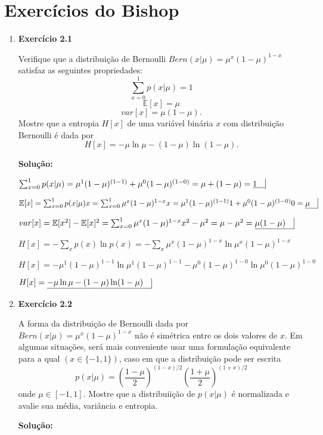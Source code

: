 \section*{Exercícios do Bishop}

\begin{enumerate}


\item \textbf{Exercício 2.1} \par
Verifique que a distribuição de Bernoulli $Bern(x|\mu) = \mu^x(1-\mu)^{1-x}$ satisfaz as  seguintes propriedades:
\begin{equation*}
    \sum_{x=0}^1 p(x|\mu) = 1
\end{equation*}
\begin{equation*}
    \mathbb{E}[x] = \mu
\end{equation*}
\begin{equation*}
    var[x]=\mu(1-\mu).
\end{equation*}
Mostre que a entropia $H[x]$ de uma variável binária $x$ com distribuição Bernoulli é dada por
\begin{equation*}
    H[x] = -\mu\ln\mu - (1-\mu)\ln(1-\mu).
\end{equation*}
\par
\textbf{Solução:}
\par
$\sum_{x=0}^{1} p(x|\mu) =  \mu^1(1-\mu)^{(1-1)} + \mu^0(1-\mu)^{(1-0)} = \mu + (1-\mu) = \underline{1 \quad} \vline $


$\mathbb{E}[x] = \sum_{x=0}^{1} p(x|\mu) x =  \sum_{x=0}^{1} \mu^x(1-\mu)^{1-x} x  = \mu^1(1-\mu)^{(1-1)} 1 + \mu^0(1-\mu)^{(1-0)} 0 = \underline{ \mu \quad} \vline $

$ var[x] = \mathbb{E}[x^2] - \mathbb{E}[x]^2 =  \sum_{x=0}^{1} \mu^x(1-\mu)^{1-x} x^2 - \mu^2 = \mu - \mu^2 = \underline{ \mu(1-\mu) \quad} \vline $

$H[x] = -\sum_x p(x) \ln p(x) = -\sum_x \mu^x(1-\mu)^{1-x} \ln  \mu^x(1-\mu)^{1-x}$

$H[x] =  - \mu^1(1-\mu)^{1-1} \ln  \mu^1(1-\mu)^{1-1} -  \mu^0(1-\mu)^{1-0} \ln  \mu^0(1-\mu)^{1-0}$

$H[x] = \underline{ - \mu \ln  \mu -   (1-\mu) \ln  (1-\mu) \quad} \vline$




\item \textbf{Exercício 2.2} \par
A forma da distribuição de Bernoulli dada por $Bern(x|\mu) = \mu^x(1-\mu)^{1-x}$  não é simétrica entre os dois valores de $x$. Em algumas situações, será mais conveniente usar uma formulação equivalente para a qual $(x \in \{-1, 1\})$, caso em que a distribuição pode ser escrita
\begin{equation*}
    p(x|\mu) = \left(\dfrac{1-\mu}{2}\right)^{(1-x)/2}\left(\dfrac{1+\mu}{2}\right)^{(1+x)/2}
\end{equation*}
onde $\mu \in [-1,1]$. Mostre que a distribuiição de $p(x|\mu)$ é normalizada e avalie sua média, variância e entropia.
\par
\textbf{Solução:}


\end{enumerate}
